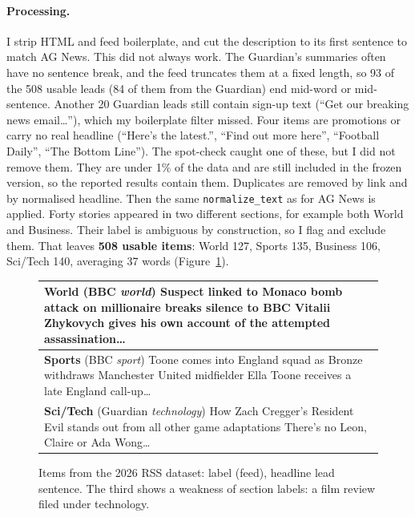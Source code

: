 \documentclass[11pt]{article}
\begin{document}
\paragraph{Processing.} I strip HTML and feed boilerplate, and cut the description to its
first sentence to match AG News. This did not always work. The Guardian's summaries often
have no sentence break, and the feed truncates them at a fixed length, so 93 of the 508
usable leads (84 of them from the Guardian) end mid-word or mid-sentence. Another 20
Guardian leads still contain sign-up text (``Get our breaking news email\ldots''), which my
boilerplate filter missed. Four items are promotions or carry no real headline (``Here's
the latest.'', ``Find out more here'', ``Football Daily'', ``The Bottom Line''). The
spot-check caught one of these, but I did not remove them. They are under 1\% of the data
and are still included in the frozen version, so the reported results contain them. Duplicates are removed by link and by normalised headline.
Then the same \texttt{normalize\_text} as for AG News is applied. Forty stories appeared in
two different sections, for example both World and Business. Their label is ambiguous by
construction, so I flag and exclude them. That leaves \textbf{508 usable items}: World 127,
Sports 135, Business 106, Sci/Tech 140, averaging 37 words (Figure~\ref{fig:rss}).

\begin{figure}[t]
\small
\begin{tabular}{@{}p{}@{}}
\toprule
\textbf{World} (BBC \emph{world}) \textbullet{} Suspect linked to Monaco bomb attack on
millionaire breaks silence to BBC \textbar{} Vitalii Zhykovych gives his own account of
the attempted assassination\ldots\\
\midrule
\textbf{Sports} (BBC \emph{sport}) \textbullet{} Toone comes into England squad as Bronze
withdraws \textbar{} Manchester United midfielder Ella Toone receives a late England
call-up\ldots\\
\midrule
\textbf{Sci/Tech} (Guardian \emph{technology}) \textbullet{} How Zach Cregger's Resident
Evil stands out from all other game adaptations \textbar{} There's no Leon, Claire or Ada
Wong\ldots\\
\bottomrule
\end{tabular}
\caption{Items from the 2026 RSS dataset: label (feed), headline \textbar{} lead sentence.
The third shows a weakness of section labels: a film review filed under technology.}
\label{fig:rss}
\end{figure}
\end{document}
